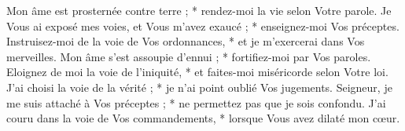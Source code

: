 Mon âme est prosternée contre terre ; * rendez-moi la vie selon Votre parole.
\versseparator
Je Vous ai exposé mes voies, et Vous m'avez exaucé ; * enseignez-moi Vos préceptes.
\versseparator
Instruisez-moi de la voie de Vos ordonnances, * et je m'exercerai dans Vos merveilles.
\versseparator
Mon âme s'est assoupie d'ennui ; * fortifiez-moi par Vos paroles.
\versseparator
Eloignez de moi la voie de l'iniquité, * et faites-moi miséricorde selon Votre loi.
\versseparator
J'ai choisi la voie de la vérité ; * je n'ai point oublié Vos jugements.
\versseparator
Seigneur, je me suis attaché à Vos préceptes ; * ne permettez pas que je sois confondu.
\versseparator
J'ai couru dans la voie de Vos commandements, * lorsque Vous avez dilaté mon cœur.